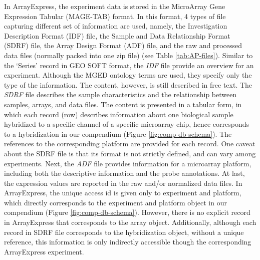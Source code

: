 %
In ArrayExpress, the experiment data is stored in the MicroArray Gene
Expression Tabular (MAGE-TAB) format.
%
In this format, 4 types of file capturing different set of information are
used, namely, the Investigation Description Format (IDF) file, the Sample and
Data Relationship Format (SDRF) file, the Array Design Format (ADF) file, and
the raw and processed data files (normally packed into one zip file) (see Table
\ref{tab:AP-files}).
%
Similar to the `Series' record in GEO SOFT format, the \textit{IDF} file
provide an overview for an experiment.
%
Although the MGED ontology terms are used, they specify only the type of the
information.  The content, however, is still described in free text.
%
The \textit{SDRF} file describes the sample characteristics and the
relationship between samples, arrays, and data files.
%
The content is presented in a tabular form, in which each record (row)
describes information about one biological sample hybridized to a specific
channel of a specific microarray chip, hence corresponds to a hybridization in
our compendium (Figure \ref{fig:comp-db-schema}).
%
The references to the corresponding platform are provided for each record.
%
One caveat about the SDRF file is that its format is not strictly defined, and
can vary among experiments.
%
Next, the \textit{ADF} file provides information for a microarray platform,
including both the descriptive information and the probe annotations.
%
At last, the expression values are reported in the raw and/or normalized
data files.
%
In ArrayExpress, the unique access id is given only to experiment and
platform, which directly corresponds to the experiment and platform object
in our compendium (Figure \ref{fig:comp-db-schema}).
%
However, there is no explicit record in ArrayExpress that corresponds to the
array object.  Additionally, although each record in SDRF file corresponds to
the hybridization object, without a unique reference, this information is only
indirectly accessible though the corresponding ArrayExpress experiment.
%

